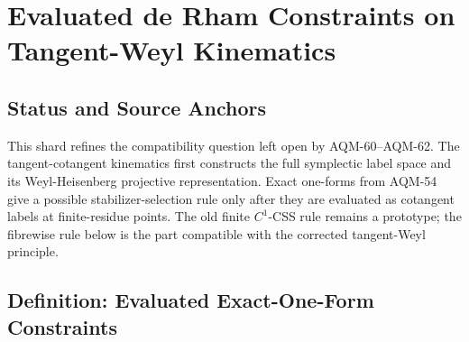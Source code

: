 
\section{Evaluated de Rham Constraints on Tangent-Weyl Kinematics}
\label{sec:evaluated-derham-constraints-tangent-weyl}

\subsection{Status and Source Anchors}

This shard refines the compatibility question left open by AQM-60--AQM-62.
The tangent-cotangent kinematics first constructs the full symplectic label
space and its Weyl-Heisenberg projective representation.  Exact one-forms from
AQM-54 give a possible stabilizer-selection rule only after they are evaluated
as cotangent labels at finite-residue points.  The old finite \(C^1\)-CSS rule
remains a prototype; the fibrewise rule below is the part compatible with the
corrected tangent-Weyl principle.

\subsection{Definition: Evaluated Exact-One-Form Constraints}

